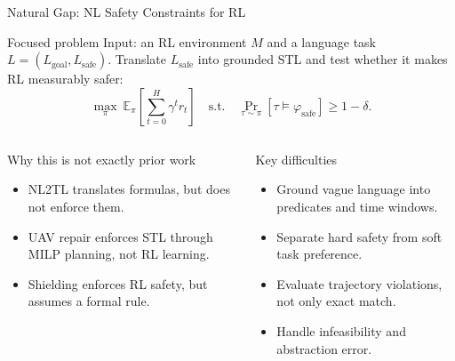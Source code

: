 \documentclass[aspectratio=169]{beamer}
\begin{document}
\begin{frame}{Natural Gap: NL Safety Constraints for RL}
\begin{block}{Focused problem}
\footnotesize
Input: an RL environment \(M\) and a language task \(L=(L_{\mathrm{goal}},L_{\mathrm{safe}})\). Translate \(L_{\mathrm{safe}}\) into grounded STL and test whether it makes RL measurably safer:
{\scriptsize
\[
\max_{\pi}\ \mathbb{E}_{\pi}\!\left[\sum_{t=0}^{H}\gamma^t r_t\right]
\quad
\text{s.t.}\quad
\Pr_{\tau\sim\pi}\!\left[\tau \models \varphi_{\mathrm{safe}}\right]\ge 1-\delta .
\]
}
\end{block}

\vspace{-0.35em}
\begin{columns}[T]
\begin{block}{Why this is not exactly prior work}
\scriptsize
\begin{itemize}
  \item NL2TL translates formulas, but does not enforce them.
  \item UAV repair enforces STL through MILP planning, not RL learning.
  \item Shielding enforces RL safety, but assumes a formal rule.
\end{itemize}
\end{block}

\begin{block}{Key difficulties}
\scriptsize
\begin{itemize}
  \item Ground vague language into predicates and time windows.
  \item Separate hard safety from soft task preference.
  \item Evaluate trajectory violations, not only exact match.
  \item Handle infeasibility and abstraction error.
\end{itemize}
\end{block}
\end{columns}
\end{frame}
\end{document}
